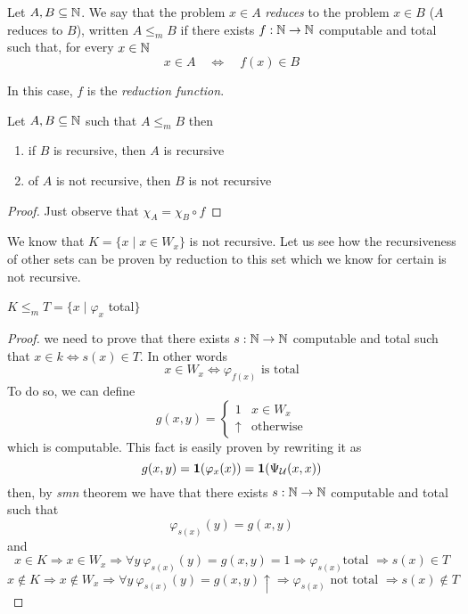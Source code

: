 \newcommand{\red}{\ensuremath{\leq_m}}
\begin{definition}
  Let $A,B \subseteq \mathbb{N}$. We say that the problem $x \in A$
  \emph{reduces} to the problem $x \in B$ ($A$ reduces to $B$), 
  written $A \red B$ if there exists
  $f : \mathbb{N} \to \mathbb{N}$ computable and total such that, for every $x \in \mathbb{N}$
  \[x \in A \quad  \Leftrightarrow \quad f(x) \in B\]
\end{definition}
In this case, $f$ is the \emph{reduction function}.

\begin{observation}
  Let $A,B \subseteq \mathbb{N}$ such that $A \red B$ then
\begin{enumerate}[label=\arabic*]
\item if $B$ is recursive, then $A$ is recursive
\item of $A$ is not recursive, then $B$ is not recursive
\end{enumerate}

\begin{proof}
Just observe that $\chi_A = \chi_B \circ f$
\end{proof}
\end{observation}

We know that $K = \{ x \mid x \in W_x \}$ is not recursive. Let us see how
the recursiveness of other sets can be proven by reduction to this
set which we know for certain is not recursive.
\begin{example}
  $K \red T = \{x \mid \varphi_x $ total$ \}$
  \begin{proof}
    we need to prove that there exists $s : \mathbb{N} \to \mathbb{N}$ computable and total
    such that $x \in k \Leftrightarrow s(x) \in T$. In other words
    \[ x\in W_x \Leftrightarrow  \varphi_{f(x)} \mbox{ is total} \]
    To do so, we can define
    \[
      g(x,y) = \begin{cases}
        1 & x\in W_x \\
        \uparrow & \mbox{otherwise}
      \end{cases}
    \]
    which is computable. This fact is easily proven by rewriting it as
    \[
      g(x,y) = \mathbf{1}(\varphi_x(x)) = \mathbf{1}(\Psi_{\mathcal{U}}(x,x))
    \]
    then, by \emph{smn} theorem we have that there exists $s: \mathbb{N} \to \mathbb{N}$
    computable and total such that 
    \[\varphi_{s(x)}(y) = g(x,y)\] and 
    \[x \in K \Rightarrow x \in W_x \Rightarrow \forall y\
      \varphi_{s(x)}(y) = g(x,y) = 1 \Rightarrow \varphi_{s(x)} \mbox{
        total } \Rightarrow s(x) \in T\]
    \[x \notin K \Rightarrow x \notin W_x \Rightarrow \forall y\
      \varphi_{s(x)}(y) = g(x,y) \uparrow \Rightarrow \varphi_{s(x)}
      \mbox{ not total } \Rightarrow s(x) \notin T\]
  \end{proof}
\end{example}

